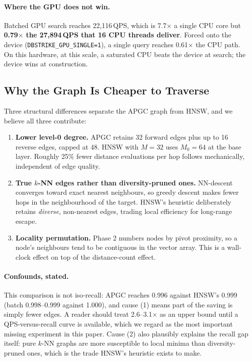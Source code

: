 \documentclass[11pt,twocolumn]{article}
\begin{document}
\paragraph{Where the GPU does not win.} Batched GPU search reaches 22,116\,QPS,
which is 7.7$\times$ a single CPU core but \textbf{0.79$\times$ the 27,894\,QPS
that 16 CPU threads deliver}. Forced onto the device
(\texttt{DBSTRIKE\_GPU\_SINGLE=1}), a single query reaches 0.61$\times$ the CPU
path. On this hardware, at this scale, a saturated CPU beats the device at
search; the device wins at construction.

\subsection{Why the Graph Is Cheaper to Traverse}
\label{sec:graphquality}

Three structural differences separate the APGC graph from HNSW, and we believe
all three contribute:

\begin{enumerate}[nosep]
    \item \textbf{Lower level-0 degree.} APGC retains 32 forward edges plus up to
    16 reverse edges, capped at 48. HNSW with $M{=}32$ uses $M_0{=}64$ at the
    base layer. Roughly 25\% fewer distance evaluations per hop follows
    mechanically, independent of edge quality.

    \item \textbf{True $k$-NN edges rather than diversity-pruned ones.}
    NN-descent converges toward exact nearest neighbours, so greedy descent
    makes fewer hops in the neighbourhood of the target. HNSW's heuristic
    deliberately retains \emph{diverse}, non-nearest edges, trading local
    efficiency for long-range escape.

    \item \textbf{Locality permutation.} Phase 2 numbers nodes by pivot
    proximity, so a node's neighbours tend to be contiguous in the vector array.
    This is a wall-clock effect on top of the distance-count effect.
\end{enumerate}

\paragraph{Confounds, stated.} This comparison is not iso-recall: APGC reaches
0.996 against HNSW's 0.999 (batch 0.998--0.999 against 1.000), and cause (1)
means part of the saving is simply
fewer edges. A reader should treat 2.6--3.1$\times$ as an upper bound until a
QPS-versus-recall curve is available, which we regard as the most important
missing experiment in this paper. Cause (2) also plausibly explains the recall
gap itself: pure $k$-NN graphs are more susceptible to local minima than
diversity-pruned ones, which is the trade HNSW's heuristic exists to make.
\end{document}
